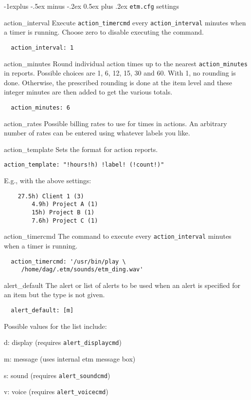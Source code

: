 \documentclass[10pt,landscape]{article}
\makeatletter
\renewcommand{\subsection}{\@startsection{subsection}{2}{0mm}%
                                {-1explus -.5ex minus -.2ex}%
                                {0.5ex plus .2ex}%
                                {\normalfont\normalsize\bfseries}}
\makeatother
\begin{document}
\begin{multicols}{3}
\subsection{\texttt{etm.cfg} settings}

\begin{compactdesc}
\item[action\_interval] Execute \verb'action_timercmd' every \verb'action_interval' minutes when a timer is running. Choose zero to disable executing the command.
\begin{verbatim}
  action_interval: 1
\end{verbatim}

\item[action\_minutes] Round individual action times up to the nearest \verb!action_minutes! in reports. Possible choices are 1, 6, 12, 15, 30 and 60. With 1, no rounding is done. Otherwise, the prescribed rounding is done at the item level and these integer minutes are then added to get the various totals.
\begin{verbatim}
  action_minutes: 6
\end{verbatim}

\item[action\_rates] Possible billing rates to use for times in actions. An arbitrary number of rates can be entered using whatever labels you like.

\item[action\_template] Sets the format for action reports.
\begin{verbatim}
action_template: "!hours!h) !label! (!count!)"
\end{verbatim}
E.g., with the above settings:
\begin{verbatim}
    27.5h) Client 1 (3)
        4.9h) Project A (1)
        15h) Project B (1)
        7.6h) Project C (1)
\end{verbatim}

\item[action\_timercmd] The command to execute every \verb'action_interval' minutes when a timer is running.
\begin{verbatim}
  action_timercmd: '/usr/bin/play \
     /home/dag/.etm/sounds/etm_ding.wav'
\end{verbatim}

\item[alert\_default] The alert or list of alerts to be used when an alert is specified for an item but the type is not given.
\begin{verbatim}
  alert_default: [m]
\end{verbatim}
Possible values for the list include:
\begin{compactdesc}
\item[d:] display (requires \verb!alert_displaycmd!)
\item[m:] message (uses internal etm message box)
\item[s:] sound (requires \verb!alert_soundcmd!)
\item[v:] voice (requires \verb!alert_voicecmd!)
\end{compactdesc}


\end{compactdesc}
\end{multicols}
\end{document}
